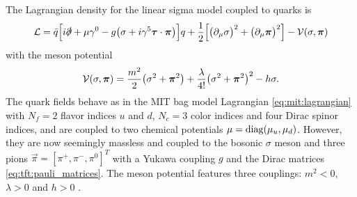 The Lagrangian density for the linear sigma model coupled to quarks is \cite{ref:jo_lsm_consistent_physical}
\begin{equation}
	\mathcal{L} = \bar{q} \Big[ i \slashed\partial + \mu \gamma^0 - g \big( \sigma + i \gamma^5 {\bm{\tau}} \cdot {\bm{\pi}} \big) \Big] q
	      + \frac12 \Big[ \big( \partial_\mu \sigma \big)^2 + \big( \partial_\mu {\bm{\pi}} \big)^2 \Big] - \mathcal{V}(\sigma,{\bm{\pi}})
\label{eq:lsm:lagrangian}
\end{equation}
with the meson potential
\begin{equation}
	\mathcal{V}(\sigma, {\bm{\pi}}) = \frac{m^2}{2} \big( \sigma^2 + {\bm{\pi}}^2 \big) + \frac{\lambda}{4!} \big( \sigma^2 + {\bm{\pi}}^2 \big)^2 - h \sigma .
\label{eq:lsm:potential}
\end{equation}
The quark fields behave as in the MIT bag model Lagrangian \eqref{eq:mit:lagrangian} with $N_f=2$ flavor indices $u$ and $d$, $N_c=3$ color indices and four Dirac spinor indices, and are coupled to two chemical potentials $\mu = \operatorname{diag} (\mu_u, \mu_d)$.
However, they are now seemingly massless and coupled to the bosonic $\sigma$ meson and three pions $\vec\pi = [\pi^+, \pi^-, \pi^0]^T$ with a Yukawa coupling $g$ and the Dirac matrices \eqref{eq:tft:pauli_matrices}.
The meson potential features three couplings: $m^2<0$, $\lambda>0$ and $h>0$ .

